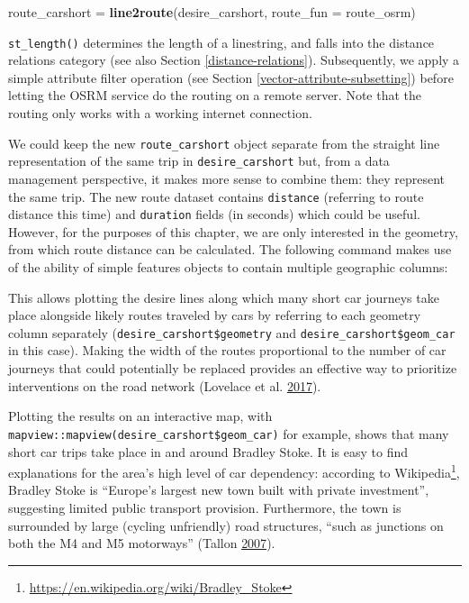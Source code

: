 \documentclass[]{krantz}
\newenvironment{Shaded}{\begin{snugshade}}{\end{snugshade}}
\newcommand{\DataTypeTok}[1]{\textcolor[rgb]{0.27,0.27,0.27}{#1}}
\newcommand{\KeywordTok}[1]{\textcolor[rgb]{0.27,0.27,0.27}{\textbf{#1}}}
\newcommand{\NormalTok}[1]{#1}
\newcommand{\OperatorTok}[1]{\textcolor[rgb]{0.43,0.43,0.43}{\textbf{#1}}}
\newcommand{\StringTok}[1]{\textcolor[rgb]{0.5,0.5,0.5}{#1}}
\let\rmarkdownfootnote\footnote%
\def\footnote{\protect\rmarkdownfootnote}
\renewcommand{\href}[2]{#2\footnote{\url{#1}}}
\begin{document}
\begin{Shaded}
\begin{Highlighting}[]
\NormalTok{route_carshort =}\StringTok{ }\KeywordTok{line2route}\NormalTok{(desire_carshort, }\DataTypeTok{route_fun =}\NormalTok{ route_osrm)}
\end{Highlighting}
\end{Shaded}

\texttt{st\_length()} determines the length of a linestring, and falls into the distance relations category (see also Section \ref{distance-relations}).
Subsequently, we apply a simple attribute filter operation (see Section \ref{vector-attribute-subsetting}) before letting the OSRM service do the routing on a remote server.
Note that the routing only works with a working internet connection.

We could keep the new \texttt{route\_carshort} object separate from the straight line representation of the same trip in \texttt{desire\_carshort} but, from a data management perspective, it makes more sense to combine them: they represent the same trip.
The new route dataset contains \texttt{distance} (referring to route distance this time) and \texttt{duration} fields (in seconds) which could be useful.
However, for the purposes of this chapter, we are only interested in the geometry, from which route distance can be calculated.
The following command makes use of the ability of simple features objects to contain multiple geographic columns:

\begin{Shaded}
\end{Shaded}

This allows plotting the desire lines along which many short car journeys take place alongside likely routes traveled by cars by referring to each geometry column separately (\texttt{desire\_carshort\$geometry} and \texttt{desire\_carshort\$geom\_car} in this case).
Making the width of the routes proportional to the number of car journeys that could potentially be replaced provides an effective way to prioritize interventions on the road network (Lovelace et al. \protect\hyperlink{ref-lovelace_propensity_2017}{2017}).

Plotting the results on an interactive map, with \texttt{mapview::mapview(desire\_carshort\$geom\_car)} for example, shows that many short car trips take place in and around Bradley Stoke.
It is easy to find explanations for the area's high level of car dependency: according to \href{https://en.wikipedia.org/wiki/Bradley_Stoke}{Wikipedia}, Bradley Stoke is ``Europe's largest new town built with private investment'', suggesting limited public transport provision.
Furthermore, the town is surrounded by large (cycling unfriendly) road structures, ``such as junctions on both the M4 and M5 motorways'' (Tallon \protect\hyperlink{ref-tallon_bristol_2007}{2007}).
\end{document}
